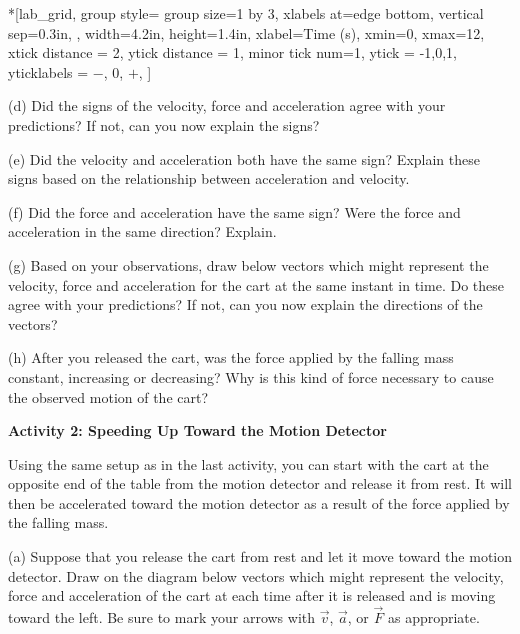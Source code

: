 \begin{lab_groupplot}*{}[lab_grid,
	group style={
		group size=1 by 3,
		xlabels at=edge bottom,
		vertical sep=0.3in,
		},
	width=4.2in,  height=1.4in,
	xlabel=Time (s),
	xmin=0, xmax=12,
	xtick distance = 2, 
	ytick distance = 1, 
	minor tick num=1,
	ytick = {-1,0,1},
	yticklabels = {$-$, 0, $+$},
	]
\nextgroupplot[
	ymin=-1,ymax=1, 
	ylabel={Velocity (m/s)},
	]
\nextgroupplot[
	ymin=-1,ymax=1, 
	ylabel={Acceleration (m/s$^2$)},
	]
\nextgroupplot[
	ymin=-1,ymax=1, 
	ylabel={Force (N)},
	]
\end{lab_groupplot}

(d) Did the signs of the velocity, force and acceleration agree with your predictions?
If not, can you now explain the signs?
\answerspace{30mm}

\pagebreak[3]
(e) Did the velocity and acceleration both have the same sign? Explain these
signs based on the relationship between acceleration and velocity.
\answerspace{20mm}

(f) Did the force and acceleration have the same sign? Were the force and acceleration
in the same direction? Explain.
\answerspace{20mm}

(g) Based on your observations, draw below vectors which might represent the
velocity, force and acceleration for the cart at the same instant in time. Do
these agree with your predictions? If not, can you now explain the directions
of the vectors?
\answerspace{20mm}

(h) After you released the cart, was the force applied by the falling mass constant,
increasing or decreasing?  Why is this kind of force necessary to cause
the observed motion of the cart?
\answerspace{20mm}

\textbf{Activity 2: Speeding Up Toward the Motion Detector }

Using the same setup as in the last activity, you can start with the cart at
the opposite end of the table from the motion detector and release it from rest.
It will then be accelerated toward the motion detector as a result of the force
applied by the falling mass.

(a) Suppose that you release the cart from rest and let it move toward the motion
detector. Draw on the diagram below vectors which might represent the velocity,
force and acceleration of the cart at each time after it is released and is
moving toward the left. Be sure to mark your arrows with $\vec{v}$, $\vec{a}$,
or $\vec{F}$ as appropriate.


